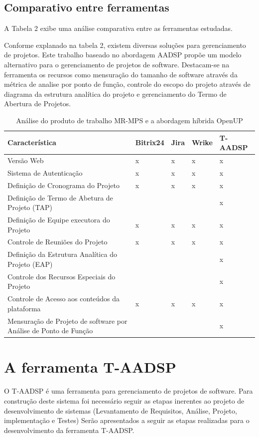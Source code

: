 \documentclass{acm_proc_article-sp}
\begin{document}
\subsection{Comparativo entre ferramentas}
 A Tabela 2 exibe uma análise comparativa entre as ferramentas estudadas.

Conforme explanado na tabela 2, existem diversas soluções para gerenciamento de projetos. Este trabalho baseado no abordagem AADSP propõe um modelo alternativo para o gerenciamento de projetos de software. Destacam-se na ferramenta os recursos como mensuração do tamanho de software através da métrica de analise por ponto de função, controle do escopo do projeto através de diagrama da estrutura analítica do projeto e gerenciamento do Termo de Abertura de Projetos. 

\begin{table}[h]
\scriptsize
\caption{Análise do produto de trabalho MR-MPS e a abordagem híbrida OpenUP} 
\centering
\begin{tabular}{|p{70mm}|p{20mm}|p{20mm}|p{20mm}|p{20mm}|}
\hline
 Característica & Bitrix24 & Jira & Wrike & T-AADSP \\
\hline
Versão Web & x & x  & x  & x \\
Sistema de Autenticação & x & x  & x  & x \\
Definição de Cronograma do Projeto & x & x  & x  & x \\
Definição de Termo de Abetura de Projeto (TAP) &  &   &  & x \\
Definição de Equipe executora do Projeto & x & x  & x  & x \\
Controle de Reuniões do Projeto  & x & x  & x  & x \\
Definição da Estrutura Analítica do Projeto (EAP) &  &   &  & x \\
Controle dos Recursos Especiais do Projeto &  &   &  & x \\
Controle de Acesso aos conteúdos da plataforma& x & x  & x  & x \\
Mensuração de Projeto de software por Análise de Ponto de Função  &  &   &  & x \\
\hline
\end{tabular}
\end{table}

\section{A ferramenta T-AADSP}
O T-AADSP é uma ferramenta para gerenciamento de projetos de software. Para construção deste sistema foi necessário seguir as etapas inerentes ao projeto de desenvolvimento de sistemas (Levantamento de Requisitos, Análise, Projeto, implementação e Testes)
Serão apresentados a seguir as etapas realizadas para o desenvolvimento da ferramenta T-AADSP.
\end{document}
